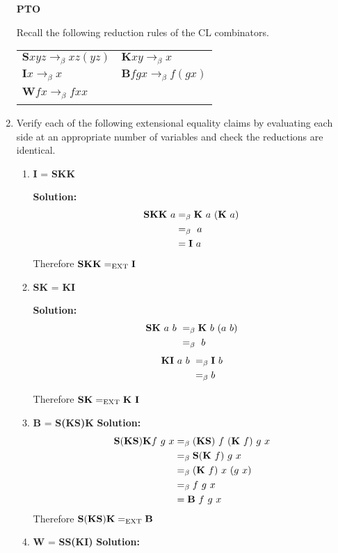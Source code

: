 \documentclass[11pt]{report}
\begin{document}
\begin{enumerate}
	 \vfill
	 \hfill \textbf{PTO}



\newpage

Recall the following reduction rules of the CL combinators. 

\begin{tabular}{l l}
$\textbf{S}xyz \to_{\beta} xz(yz)$ & $\textbf{K}xy \to_{\beta} x$ \\
$\textbf{I}x \to_{\beta} x$ & $\textbf{B}fgx \to_{\beta}f(gx)$ \\
$\textbf{W}fx \to_{\beta}fxx$ & \
\end{tabular}

\item Verify each of the following extensional equality claims by evaluating each side at an appropriate number of variables and check the reductions are identical.

	\begin{enumerate}
		\item \textbf{I} = \textbf{SKK}
		
		\textbf{Solution:}
		\begin{align*}
			\textbf{S} \textbf{K} \textbf{K} \ a &=_{\beta} \textbf{K} \ a \ (\textbf{K} \ a) \\
			&=_{\beta} \ a \\ 
			&= \textbf{I} \ a
		\end{align*}
		Therefore $\textbf{S} \textbf{K} \textbf{K} =_{\text{EXT}} \textbf{I}$
		
		\item \textbf{SK} = \textbf{KI}
		
		\textbf{Solution:}		
		\begin{align*}
			\textbf{S} \textbf{K} \ a \ b \ &=_{\beta} \textbf{K} \ b \ (a \ b) \\
			&=_{\beta} \ b		
		\end{align*}
		\begin{align*}
			\textbf{K} \textbf{I} \ a \ b \ &=_{\beta} \textbf{I} \ b \\
			&=_{\beta} b		
		\end{align*}
		
		Therefore $\cS\cK =_{\text{EXT}} \cK \ \cI$
		
		\item \textbf{B} = \textbf{S(KS)K}		
		\textbf{Solution:}		
		\begin{align*}
			\textbf{S}(\textbf{K} \textbf{S})\textbf{K} f \ g \ x &=_{\beta} (\textbf{K}\textbf{S}) \ f \ (\textbf{K} \ f) \ g \ x \\
			&=_{\beta} \textbf{S}(\textbf{K} \ f) \ g \ x \\
			&=_{\beta} (\textbf{K} \ f) \ x \ (g \ x) \\
			&=_{\beta} f \ g \ x \\
			&= \textbf{B} \ f \ g \ x	
		\end{align*}
		Therefore $\textbf{S}(\textbf{K}\textbf{S})\textbf{K} =_{\text{EXT}} \textbf{B}$
		\item \textbf{W} = \textbf{SS(KI)}		
		\textbf{Solution:}
		

\end{enumerate}
\end{enumerate}
\end{document}
